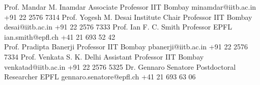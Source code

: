 
\begin{referees}
		{Prof. Mandar M. Inamdar}
		{Associate Professor}
		{IIT Bombay}
		{minamdar@iitb.ac.in}
		{+91 22 2576 7314}
		{Prof. Yogesh M. Desai}
		{Institute Chair Professor}
		{IIT Bombay}
		{desai@iitb.ac.in}
		{+91 22 2576 7333} 
		{Prof. Ian F. C. Smith}
		{Professor}
		{EPFL}
		{ian.smith@epfl.ch}
		{+41 21 693 52 42}\\
	
	\vspace{5pt}
	    {Prof. Pradipta Banerji}
	    {Professor}
	    {IIT Bombay}
	    {pbanerji@iitb.ac.in}
	    {+91 22 2576 7334}
        {Prof. Venkata S. K. Delhi}
        {Assistant Professor}
        {IIT Bombay}
        {venkatad@iitb.ac.in}
        {+91 22 2576 5325}
	    {Dr. Gennaro Senatore}
	    {Postdoctoral Researcher}
	    {EPFL}
	    {gennaro.senatore@epfl.ch}
	    {+41 21 693 63 06}
\end{referees}